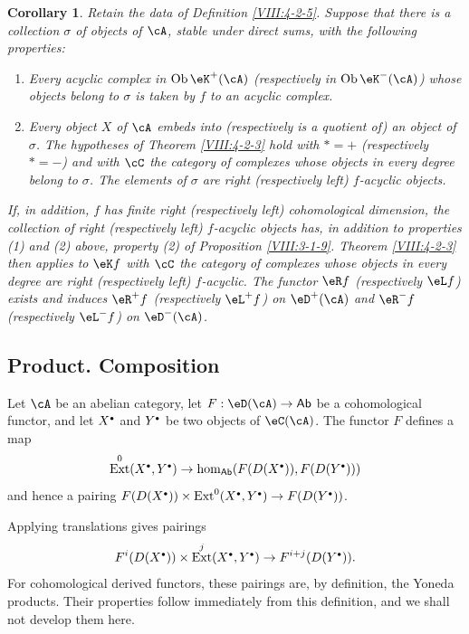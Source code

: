 \documentclass[12pt,oneside,english]{smfbook}
\DeclareMathOperator{\ext}{Ext}
\newtheorem{corollary}[subsubsection]{Corollary}
\let\oldbullet\bullet
\renewcommand{\bullet}{\textnormal{\tiny$\oldbullet$}}
\begin{document}
\begin{corollary}\label{VIII:4-2-3-2} %
Retain the data of Definition \ref{VIII:4-2-5}. Suppose that there is a collection $\sigma$ of objects of $\cA$, stable under direct sums, with the following properties:
\begin{enumerate}
  \item Every acyclic complex in $\operatorname{Ob}\eK^+(\cA)$ (respectively in $\operatorname{Ob}\eK^-(\cA)$) whose objects belong to $\sigma$ is taken by $f$ to an acyclic complex.
  \item Every object $X$ of $\cA$ embeds into (respectively is a quotient of) an object of $\sigma$. The hypotheses of Theorem \ref{VIII:4-2-3} hold with $\ast=+$ (respectively $\ast=-$) and with $\cC$ the category of complexes whose objects in every degree belong to $\sigma$. The elements of $\sigma$ are right (respectively left) $f$-acyclic objects.
\end{enumerate}

If, in addition, $f$ has finite right (respectively left) cohomological dimension, the collection of right (respectively left) $f$-acyclic objects has, in addition to properties (1) and (2) above, property (2) of Proposition \ref{VIII:3-1-9}. Theorem \ref{VIII:4-2-3} then applies to $\eK f$ with $\cC$ the category of complexes whose objects in every degree are right (respectively left) $f$-acyclic. The functor $\eR f$ (respectively $\eL f$) exists and induces $\eR^+f$ (respectively $\eL^+f$) on $\eD^+(\cA)$ and $\eR^-f$ (respectively $\eL^-f$) on $\eD^-(\cA)$.
\end{corollary}

\subsection{Product. Composition}\label{VIII:4-3}

Let $\cA$ be an abelian category, let $F:\eD(\cA)\to\mathsf{Ab}$ be a cohomological functor, and let $X^\bullet$ and $Y^\bullet$ be two objects of $\eC(\cA)$. The functor $F$ defines a map
\[
  \ext^0(X^\bullet,Y^\bullet) \to \hom_{\mathsf{Ab}}(F(D(X^\bullet)),F(D(Y^\bullet)))
\]
and hence a pairing $F(D(X^\bullet))\times \ext^0(X^\bullet,Y^\bullet) \to F(D(Y^\bullet))$.

Applying translations gives pairings
\[
  F^i(D(X^\bullet))\times \ext^j(X^\bullet,Y^\bullet) \to F^{i+j}(D(Y^\bullet)) \text{.}
\]
For cohomological derived functors, these pairings are, by definition, the Yoneda products. Their properties follow immediately from this definition, and we shall not develop them here.
\end{document}
